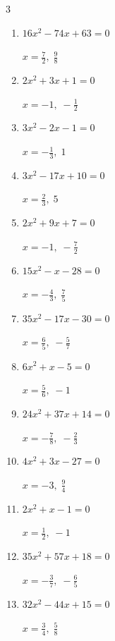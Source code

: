 \begin{multicols}{3}
\begin{enumerate}
  \item $16x^{2}-74x+63=0$

        $\displaystyle x=\frac{7}{2},\; \frac{9}{8}$

  \item $2x^{2}+3x+1=0$

        $\displaystyle x=-1,\; -\frac{1}{2}$

  \item $3x^{2}-2x-1=0$

        $\displaystyle x=-\frac{1}{3},\; 1$

  \item $3x^{2}-17x+10=0$

        $\displaystyle x=\frac{2}{3},\; 5$

\columnbreak %

\resetques

  \item $2x^{2}+9x+7=0$

        $\displaystyle x=-1,\; -\frac{7}{2}$

  \item $15x^{2}-x-28=0$

        $\displaystyle x=-\frac{4}{3},\; \frac{7}{5}$

  \item $35x^{2}-17x-30=0$

        $\displaystyle x=\frac{6}{5},\; -\frac{5}{7}$

  \item $6x^{2}+x-5=0$

        $\displaystyle x=\frac{5}{6},\; -1$

  \item $24x^{2}+37x+14=0$

        $\displaystyle x=-\frac{7}{8},\; -\frac{2}{3}$

  \item $4x^{2}+3x-27=0$

        $\displaystyle x=-3,\; \frac{9}{4}$

  \item $2x^{2}+x-1=0$

        $\displaystyle x=\frac{1}{2},\; -1$

  \item $35x^{2}+57x+18=0$

        $\displaystyle x=-\frac{3}{7},\; -\frac{6}{5}$

  \item $32x^{2}-44x+15=0$

        $\displaystyle x=\frac{3}{4},\; \frac{5}{8}$


\end{enumerate}
\end{multicols}
